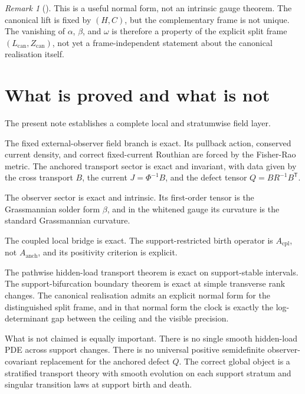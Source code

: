 \documentclass[11pt,a4paper]{article}
\numberwithin{equation}{section}
\theoremstyle{thmcompact}
\theoremstyle{remark}
\newtheorem*{remarkplain}{Remark}
\newenvironment{remark}[1][]%
{\begin{remarkbox}\begin{remarkplain}[#1]\normalfont}
{\end{remarkplain}\end{remarkbox}}
\begin{document}
\begin{remark}
This is a useful normal form, not an intrinsic gauge theorem. The canonical lift is fixed by $(H,C)$, but the complementary frame is not unique. The vanishing of $\alpha$, $\beta$, and $\omega$ is therefore a property of the explicit split frame $(L_{\mathrm{can}},Z_{\mathrm{can}})$, not yet a frame-independent statement about the canonical realisation itself.
\end{remark}

\section{What is proved and what is not}

The present note establishes a complete local and stratumwise field layer.

The fixed external-observer field branch is exact. Its pullback action, conserved current density, and correct fixed-current Routhian are forced by the Fisher-Rao metric. The anchored transport sector is exact and invariant, with data given by the cross transport $B$, the current $J=\Phi^{-1}B$, and the defect tensor $Q=BR^{-1}B^{\mathsf T}$.

The observer sector is exact and intrinsic. Its first-order tensor is the Grassmannian solder form $\beta$, and in the whitened gauge its curvature is the standard Grassmannian curvature.

The coupled local bridge is exact. The support-restricted birth operator is $A_{\mathrm{cpl}}$, not $A_{\mathrm{anch}}$, and its positivity criterion is explicit.

The pathwise hidden-load transport theorem is exact on support-stable intervals. The support-bifurcation boundary theorem is exact at simple transverse rank changes. The canonical realisation admits an explicit normal form for the distinguished split frame, and in that normal form the clock is exactly the log-determinant gap between the ceiling and the visible precision.

What is not claimed is equally important. There is no single smooth hidden-load PDE across support changes. There is no universal positive semidefinite observer-covariant replacement for the anchored defect $Q$. The correct global object is a stratified transport theory with smooth evolution on each support stratum and singular transition laws at support birth and death.
\end{document}
